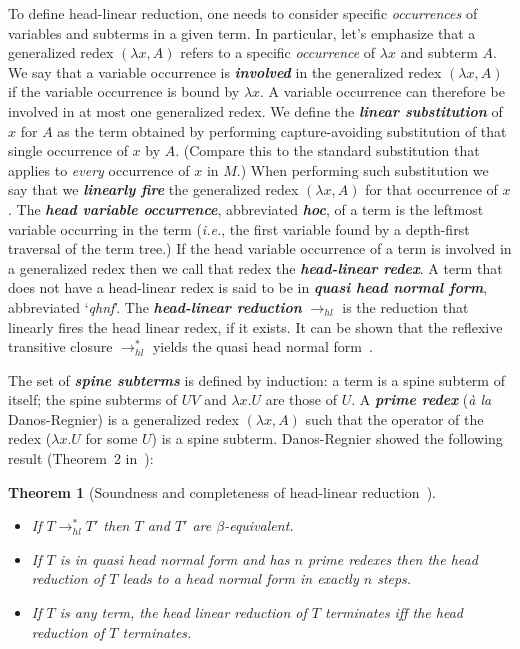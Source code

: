 \documentclass[xchauthor,chkrefs,GCNS,amsmath,amsthm,rotating,leaveRGB]{tcsg}
\renewcommand{\index}[1]{}
\theoremstyle{plain}
\newtheorem{theorem}{Theorem}[section]
\theoremstyle{definition}
\newcommand{\hlred}{\rightarrow_{hl}}
\begin{document}
To define head-linear reduction, one needs to consider specific
\emph{occurrences} of variables and subterms in a given term. In particular,
let's emphasize that a generalized redex  $(\lambda x, A)$ refers to a
specific \emph{occurrence} of $\lambda x$ and subterm $A$. We say that a
variable occurrence is \textbf{\emph{involved}}\index{involved} in the
generalized redex $(\lambda x, A)$ if the variable occurrence is bound by
$\lambda x$. A variable occurrence can therefore be involved in at most one
generalized redex. We define the \textbf{\emph{linear
substitution}}\index{linear substitution} of $x$ for $A$ as the term obtained
by performing capture-avoiding substitution of that single occurrence of $x$
by $A$. (Compare this to the standard substitution that applies to
\emph{every} occurrence of $x$ in $M$.) When performing such substitution we
say that we \textbf{\emph{linearly fire}}\index{linearly fire} the
generalized redex $(\lambda x, A)$ for that occurrence of $x$. The
\textbf{\emph{head variable occurrence}}\index{head variable occurrence},
abbreviated \textbf{\emph{hoc}}\index{hoc}, of a term is the leftmost
variable occurring in the term (\textit{i.e.}, the first variable found by a
depth-first traversal of the term tree.) If the head variable occurrence of a
term is involved in a generalized redex then we call that redex the
\textbf{\emph{head-linear redex}}\index{head-linear redex}. A term that does
not have a head-linear redex is said to be in \textbf{\emph{quasi head normal
form}}\index{quasi head normal form}, abbreviated `\emph{qhnf}'. The
\textbf{\emph{head-linear reduction}}\index{head-linear reduction} $\hlred $
is the reduction that linearly fires the head linear redex, if it exists. It
can be shown that the reflexive transitive closure $\rightarrow ^{*}_{hl}$
yields the quasi head normal form~\cite{danos-head,danosherbelinregnier1996}.

The set of \textbf{\emph{spine subterms}}\index{spine subterms} is defined by
induction: a term is a spine subterm of itself; the spine subterms of $U V$
and $\lambda x. U$ are those of $U$. A \textbf{\emph{prime
redex}}\index{prime redex} (\emph{\`{a} la} Danos-Regnier) is a generalized
redex $(\lambda x, A)$ such that the operator of the redex ($\lambda x . U$
for some $U$) is a spine subterm. Danos-Regnier showed the following result
(Theorem~2 in~\cite{danos-head}):

\begin{theorem}[Soundness and completeness of head-linear reduction~\cite{danos-head}]\label{thm:danosregnier_headlinred}
%
\begin{itemize}
\item If $T \rightarrow ^{*}_{hl} T'$  then $T$ and $T'$ are $\beta
    $-equivalent.
\item If $T$ is in quasi head normal form and has $n$ prime redexes then
    the head reduction of $T$ leads to a head normal form in exactly $n$
    steps.
\item If $T$ is any term, the head linear reduction of $T$ terminates iff
    the head reduction of $T$ terminates.
\end{itemize}
\end{theorem}
\end{document}
